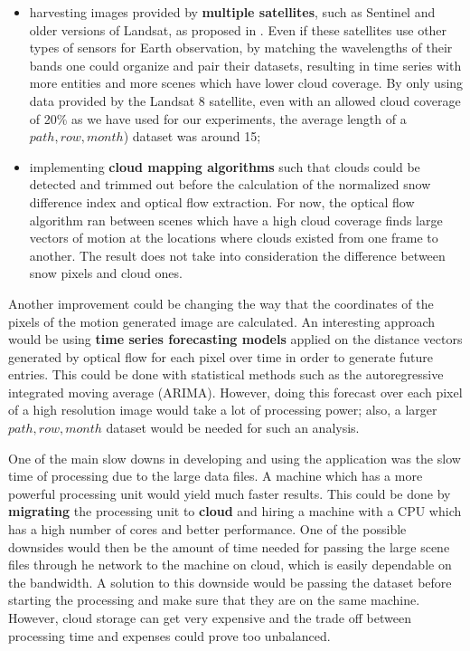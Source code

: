 \documentclass[12pt, a4paper]{report}
\begin{document}
	\begin{itemize}
		\item harvesting images provided by \textbf{multiple satellites}, such as Sentinel and older versions of Landsat, as proposed in \cite{WINSVOLD2017}. Even if these satellites use other types of sensors for Earth observation, by matching the wavelengths of their bands one could organize and pair their datasets, resulting in time series with more entities and more scenes which have lower cloud coverage. By only using data provided by the Landsat 8 satellite, even with an allowed cloud coverage of 20\% as we have used for our experiments, the average length of a \(path, row, month\)) dataset was around 15;
		\item implementing \textbf{cloud mapping algorithms} such that clouds could be detected and trimmed out before the calculation of the normalized snow difference index and optical flow extraction. For now, the optical flow algorithm ran between scenes which have a high cloud coverage finds large vectors of motion at the locations where clouds existed from one frame to another. The result does not take into consideration the difference between snow pixels and cloud ones. 
	\end{itemize}
	
	\par Another improvement could be changing the way that the coordinates of the pixels of the motion generated image are calculated. An interesting approach would be using \textbf{time series forecasting models} applied on the distance vectors generated by optical flow for each pixel over time in order to generate future entries. This could be done with statistical methods such as the autoregressive integrated moving average (ARIMA). However, doing this forecast over each pixel of a high resolution image would take a lot of processing power; also, a larger \(path, row, month\) dataset would be needed for such an analysis.
	
	\par One of the main slow downs in developing and using the application was the slow time of processing due to the large data files. A machine which has a more powerful processing unit would yield much faster results. This could be done by \textbf{migrating} the processing unit to \textbf{cloud} and hiring a machine with a CPU which has a high number of cores and better performance. One of the possible downsides would then be the amount of time needed for passing the large scene files through he network to the machine on cloud, which is easily dependable on the bandwidth. A solution to this downside would be passing the dataset before starting the processing and make sure that they are on the same machine. However, cloud storage can get very expensive and the trade off between processing time and expenses could prove too unbalanced.
	
\end{document}
